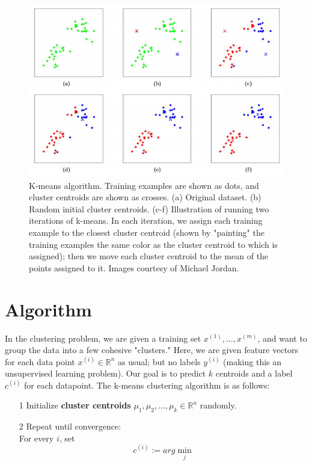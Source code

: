 \documentclass[10pt,letterpaper]{article}
\begin{document}
\begin{figure}[h]
\includegraphics[scale=0.8]{kmeansViz.png}
\centering
\caption{K-means algorithm. Training examples are shown as dots, and cluster centroids are shown as crosses. (a) Original dataset. (b) Random initial cluster centroids. (c-f) Illustration of running two iterations of k-means. In each iteration, we assign each training example to the closest cluster centroid (shown by "painting" the training examples the same color as the cluster centroid to which is assigned); then we move each cluster centroid to the mean of the points assigned to it. Images courtesy of Michael Jordan.}
\label{figure1}
\end{figure}

\section{Algorithm}
In the clustering problem, we are given a training set ${x^{(1)}, ... , x^{(m)}}$, and want to group the data into a few cohesive "clusters." Here, we are given feature vectors for each data point $x^{(i)} \in \mathbb{R}^n$ as usual; but no labels $y^{(i)}$ (making this an unsupervised learning problem). Our goal is to predict $k$ centroids and a label $c^{(i)}$ for each datapoint. The k-means clustering algorithm is as follows:

\begin{itemize}
\item[1] Initialize \textbf{cluster centroids} $\mu_{1}, \mu_{2}, \ldots , \mu_{k} \in \mathbb{R}^{n}$ randomly.
\item[2] Repeat until convergence:{\\

		For every $i$, set \\
		$$c^(i):=arg \min_{j}$$
		}
\end{itemize}
\end{document}

